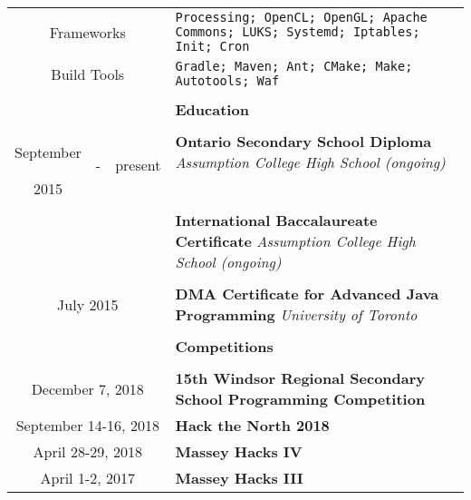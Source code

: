 \documentclass[10pt]{article}
\begin{document}
\begin{table}[ht]
\begin{tabular}{@{\hspace{0mm}}c@{\hspace{1mm}}c@{\hspace{3mm}}cl}
            \multicolumn{3}{c}{Frameworks} & \texttt{Processing; OpenCL; OpenGL; Apache Commons; LUKS; Systemd; Iptables; Init; Cron}\\[-1mm]
            \multicolumn{3}{c}{Build Tools} & \texttt{Gradle; Maven; Ant; CMake; Make; Autotools; Waf}\\[-1mm]
            & & & \color{maroon}{\rule{14cm}{0.75pt}}\\
            & & & \large{\textbf{Education}}\\[-2mm]
            & & & \color{maroon}{\rule{14cm}{0.75pt}}\\
            September & \multirow{2}{*}{-} & \multirow{2}{*}{present} & \textbf{Ontario Secondary School Diploma} \textit{Assumption College High School (ongoing)}\\[-1mm]
            2015 & & &\\
            \vspace*{-6.5mm}\\
            & & & \textbf{International Baccalaureate Certificate} \textit{Assumption College High School (ongoing)}\\
            \vspace*{-2.75mm}\\
            \multicolumn{3}{c}{July 2015} & \textbf{DMA Certificate for Advanced Java Programming} \textit{University of Toronto}\\[1mm]
            & & & \color{maroon}{\rule{14cm}{0.75pt}}\\
            & & & \large{\textbf{Competitions}}\\[-2mm]
            & & & \color{maroon}{\rule{14cm}{0.75pt}}\\
            \multicolumn{3}{c}{December 7, 2018} & \textbf{15th Windsor Regional Secondary School Programming Competition}\\
            \multicolumn{3}{c}{September 14-16, 2018} & \textbf{Hack the North 2018}\\
            \multicolumn{3}{c}{April 28-29, 2018} & \textbf{Massey Hacks IV}\\
            \multicolumn{3}{c}{April 1-2, 2017} & \textbf{Massey Hacks III}\\

\end{tabular}
\end{table}
\end{document}
